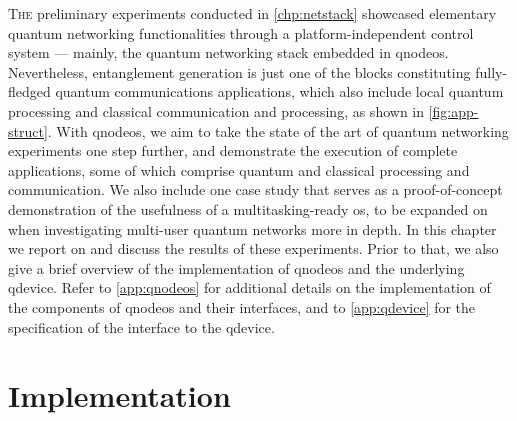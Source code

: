 \lettrine{T}{he} preliminary experiments conducted in \cref{chp:netstack} showcased elementary
quantum networking functionalities through a platform-independent control system --- mainly, the
quantum networking stack embedded in \acrshort{qnodeos}. Nevertheless, entanglement generation is
just one of the blocks constituting fully-fledged quantum communications applications, which also
include local quantum processing and classical communication and processing, as shown in
\cref{fig:app-struct}. With \acrshort{qnodeos}, we aim to take the state of the art of quantum
networking experiments one step further, and demonstrate the execution of complete applications,
some of which comprise quantum and classical processing and communication. We also include one case
study that serves as a proof-of-concept demonstration of the usefulness of a multitasking-ready
\acrshort{os}, to be expanded on when investigating multi-user quantum networks more in depth. In
this chapter we report on and discuss the results of these experiments. Prior to that, we also give
a brief overview of the implementation of \acrshort{qnodeos} and the underlying \acrshort{qdevice}.
Refer to \cref{app:qnodeos} for additional details on the implementation of the components of
\acrshort{qnodeos} and their interfaces, and to \cref{app:qdevice} for the specification of the
interface to the \acrshort{qdevice}.

\section{Implementation}
\label{sec:qnodeos:implementation}

